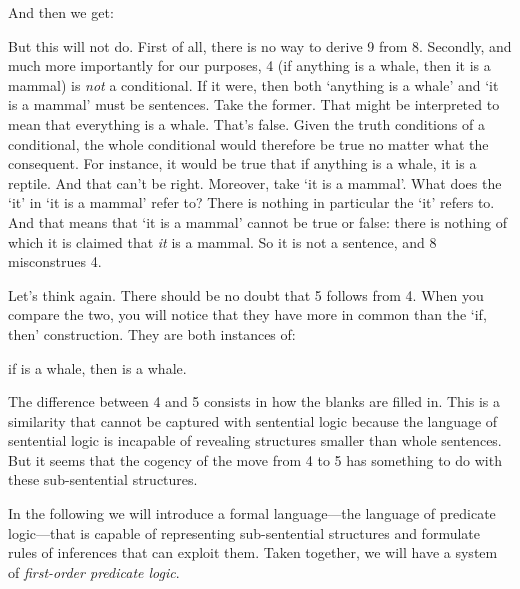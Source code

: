 And then we get:

\begin{argumentN}[8]

 \aitem {}
 \aitem {}
 \aitem {}
 \aitem {}

\end{argumentN}

But this will not do. First of all, there is no way to derive 9 from 8. Secondly, 
and much more importantly for our purposes, 4 (if anything is a whale, then it 
is a mammal) is \emph{not} a conditional. If it were, then both `anything is a 
whale' and `it is a mammal' must be sentences. Take the former. That might be 
interpreted to mean that everything is a whale. That's false. Given the truth 
conditions of a conditional, the whole conditional would therefore be true no 
matter what the consequent. For instance, it would be true that if anything is a 
whale, it is a reptile. And that can't be right. Moreover, take `it is a 
mammal'.  What does the `it' in `it is a mammal' refer to? There is nothing in 
particular the `it' refers to.  And that means that `it is a mammal' cannot be 
true or false: there is nothing of which it is claimed that \emph{it} is a 
mammal.  So it is not a sentence, and 8 misconstrues 4.

Let's think again. There should be no doubt that 5 follows from 4. When you 
compare the two, you will notice that they have more in common than the `if, 
then' construction.  They are both instances of:

\begin{center}
 if \blank{} is a whale, then \blank{} is a whale.

\end{center}

The difference between 4 and 5 consists in how the blanks are filled in. This is 
a similarity that cannot be captured with sentential logic because the language 
of sentential logic is incapable of revealing structures smaller than whole 
sentences. But it seems that the cogency of the move from 4 to 5 has something 
to do with these sub-sentential structures.

In the following we will introduce a formal language---the language of predicate 
logic---that is capable of representing sub-sentential structures and formulate 
rules of inferences that can exploit them. Taken together, we will have a system 
of \emph{first-order predicate logic}.

